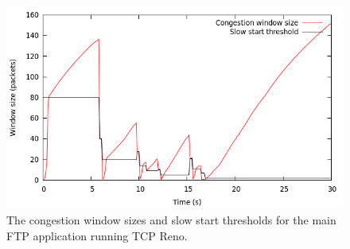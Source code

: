 \begin{enumerate}
 \begin{figure}[h]
 \label{fig:ex2congestionwindowreno}
  \centering
    \includegraphics[scale=0.5]{ex2congestionwindowreno.png}
  \caption{The congestion window sizes and slow start thresholds for the main FTP application running TCP Reno.}
 \end{figure}
 
 
\end{enumerate}